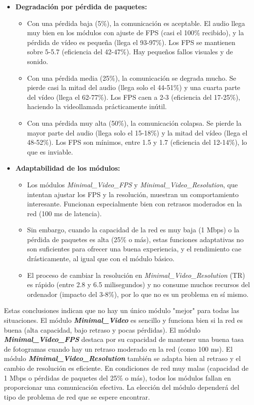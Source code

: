 \begin{itemize}
\item \textbf{Degradación por pérdida de paquetes:}
\begin{itemize}
    \item Con una pérdida baja (5\%), la comunicación es aceptable. El audio llega muy bien en los módulos con ajuste de FPS (casi el 100\% recibido), y la pérdida de vídeo es pequeña (llega el 93-97\%). Los FPS se mantienen sobre 5-5.7 (eficiencia del 42-47\%). Hay pequeños fallos visuales y de sonido.
    \item Con una pérdida media (25\%), la comunicación se degrada mucho. Se pierde casi la mitad del audio (llega solo el 44-51\%) y una cuarta parte del vídeo (llega el 62-77\%). Los FPS caen a 2-3 (eficiencia del 17-25\%), haciendo la videollamada prácticamente inútil.
    \item Con una pérdida muy alta (50\%), la comunicación colapsa. Se pierde la mayor parte del audio (llega solo el 15-18\%) y la mitad del vídeo (llega el 48-52\%). Los FPS son mínimos, entre 1.5 y 1.7 (eficiencia del 12-14\%), lo que es inviable.
\end{itemize}

\item \textbf{Adaptabilidad de los módulos:}
\begin{itemize}
    \item Los módulos \textit{Minimal\_Video\_FPS} y \textit{Minimal\_Video\_Resolution}, que intentan ajustar los FPS y la resolución, muestran un comportamiento interesante. Funcionan especialmente bien con retrasos moderados en la red (100 ms de latencia).
    \item Sin embargo, cuando la capacidad de la red es muy baja (1 Mbps) o la pérdida de paquetes es alta (25\% o más), estas funciones adaptativas no son suficientes para ofrecer una buena experiencia, y el rendimiento cae drásticamente, al igual que con el módulo básico.
    \item El proceso de cambiar la resolución en \textit{Minimal\_Video\_Resolution} (TR) es rápido (entre 2.8 y 6.5 milisegundos) y no consume muchos recursos del ordenador (impacto del 3-8\%), por lo que no es un problema en sí mismo.
\end{itemize}
\end{itemize}

Estas conclusiones indican que no hay un único módulo "mejor" para todas las situaciones.
El módulo \textbf{\textit{Minimal\_Video}} es sencillo y funciona bien si la red es buena (alta capacidad, bajo retraso y pocas pérdidas).
El módulo \textbf{\textit{Minimal\_Video\_FPS}} destaca por su capacidad de mantener una buena tasa de fotogramas cuando hay un retraso moderado en la red (como 100 ms).
El módulo \textbf{\textit{Minimal\_Video\_Resolution}} también se adapta bien al retraso y el cambio de resolución es eficiente.
En condiciones de red muy malas (capacidad de 1 Mbps o pérdidas de paquetes del 25\% o más), todos los módulos fallan en proporcionar una comunicación efectiva. La elección del módulo dependerá del tipo de problema de red que se espere encontrar.

